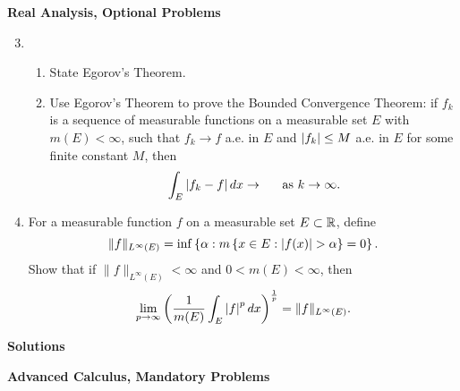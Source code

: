 \documentclass[12pt]{article}
\theoremstyle{plain}
\begin{document}
\begin{center}
    {\bf\Large Real Analysis, Optional Problems}
\end{center}
\begin{enumerate}
    \setcounter{enumi}{2}
    \item \begin{enumerate}
    \item State Egorov's Theorem.
    \item Use Egorov's Theorem to prove the Bounded Convergence Theorem: if ${f_k}$ is a sequence of measurable functions on a measurable set $E$ with $m(E) < \infty$, such that $f_k \rightarrow f$ a.e. in $E$ and $\left| f_k \right| \leq M$ a.e. in $E$ for some finite constant $M$, then
    \[
        \int_E{\left| f_k-f \right|dx}\rightarrow \textrm{\hspace{12pt} as } k\rightarrow\infty.
    \]
    \end{enumerate}
    
    \item For a measurable function $f$ on a measurable set $E\subset\mathbb{R}$, define
    \[
        \| f \|_{L^{\infty}(E)} = \inf\left\{\alpha : m\left\{x\in E : \card{f(x)}>\alpha\right\} = 0\right\}.
    \]
    Show that if $\| f \|_{L^{\infty}(E)} < \infty$ and $0 < m(E) < \infty$, then
    \[
        \lim_{p\rightarrow\infty}\left(\frac{1}{m(E)}\int_{E}{\left| f \right|^pdx}\right)^{\frac{1}{p}} = \| f \|_{L^{\infty}(E)}.
    \]
\end{enumerate}

\newpage
\vspace*{\fill}
\begin{center}
    {\bf\Huge Solutions}
\end{center}
\vspace*{\fill}

\newpage
\begin{center}
    {\bf\Large Advanced Calculus, Mandatory Problems}
\end{center}
\end{document}
